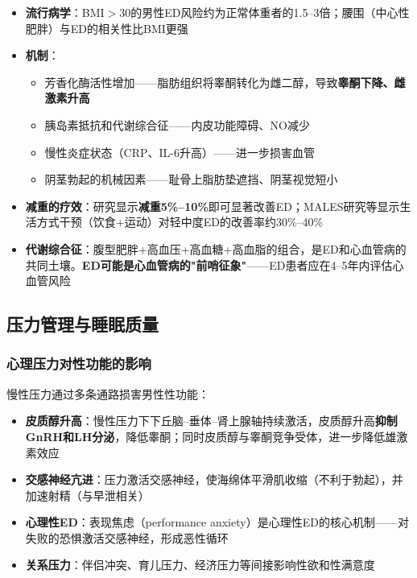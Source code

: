 \documentclass[12pt,a4paper,twoside]{ctexbook}
\begin{document}
\begin{itemize}[leftmargin=2cm]
	\item \textbf{流行病学}：BMI$>$30的男性ED风险约为正常体重者的1.5--3倍；腰围（中心性肥胖）与ED的相关性比BMI更强
	\item \textbf{机制}：
    \begin{itemize}
    	\item 芳香化酶活性增加——脂肪组织将睾酮转化为雌二醇，导致\textbf{睾酮下降、雌激素升高}
    	\item 胰岛素抵抗和代谢综合征——内皮功能障碍、NO减少
    	\item 慢性炎症状态（CRP、IL-6升高）——进一步损害血管
    	\item 阴茎勃起的机械因素——耻骨上脂肪垫遮挡、阴茎视觉短小
    \end{itemize}
	\item \textbf{减重的疗效}：研究显示\textbf{减重5\%--10\%}即可显著改善ED；MALES研究等显示生活方式干预（饮食+运动）对轻中度ED的改善率约30\%--40\%
	\item \textbf{代谢综合征}：腹型肥胖+高血压+高血糖+高血脂的组合，是ED和心血管病的共同土壤。\textbf{ED可能是心血管病的"前哨征象"}——ED患者应在4--5年内评估心血管风险
\end{itemize}

\subsection{压力管理与睡眠质量}

\subsubsection{心理压力对性功能的影响}

慢性压力通过多条通路损害男性性功能：

\begin{itemize}[leftmargin=2cm]
	\item \textbf{皮质醇升高}：慢性压力下下丘脑--垂体--肾上腺轴持续激活，皮质醇升高\textbf{抑制GnRH和LH分泌}，降低睾酮；同时皮质醇与睾酮竞争受体，进一步降低雄激素效应
	\item \textbf{交感神经亢进}：压力激活交感神经，使海绵体平滑肌收缩（不利于勃起），并加速射精（与早泄相关）
	\item \textbf{心理性ED}：表现焦虑（performance anxiety）是心理性ED的核心机制——对失败的恐惧激活交感神经，形成恶性循环
	\item \textbf{关系压力}：伴侣冲突、育儿压力、经济压力等间接影响性欲和性满意度
\end{itemize}
\end{document}

